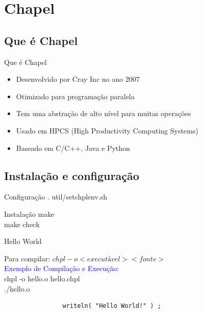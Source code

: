 \section{Chapel}
	\subsection{Que é Chapel}
		\begin{frame}{Que é Chapel}
			\begin{itemize}
				\item Desenvolvido por Cray Inc no ano 2007\cite{ChapelOff}
				\item Otimizado para programação paralela
				\item Tem uma abstração de alto nível para muitas operações
				\item Usado em HPCS (High Productivity Computing Systems)
				\item Baseado em C/C++, Java e Python
			\end{itemize}
		\end{frame}
		
	\subsection{Instalação e configuração}
		\begin{frame}
			\begin{block}{Configuração}
				. util/setchplenv.sh
			\end{block}
			\vskip10mm
			\begin{block}{Instalação}
				make \\
				make check
			\end{block}
		\end{frame}
		\begin{frame}[fragile]{Hello World}
			\begin{block}{}
				Para compilar: $chpl -o <executável> <fonte>$ \\
				\textcolor{blue}{Exemplo de Compilação e Execução:} \\
				chpl -o hello.o hello.chpl \\
				./hello.o
			\end{block}
			\vskip15mm
			\begin{lstlisting}
				writeln( "Hello World!" ) ;
			\end{lstlisting}
		\end{frame}
		
